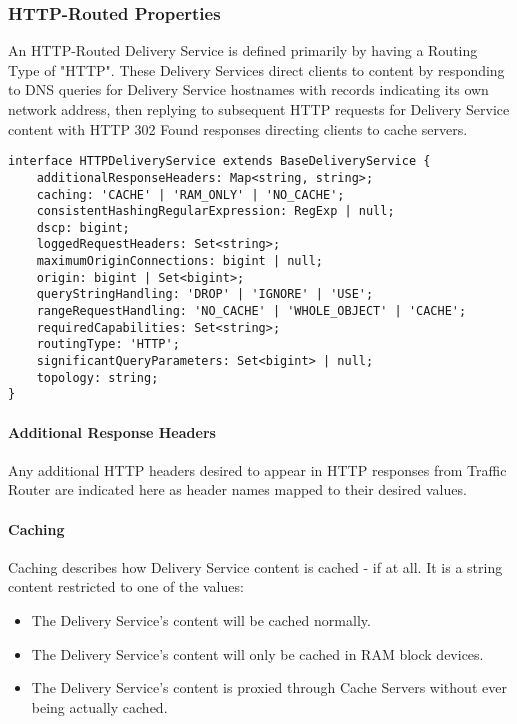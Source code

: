 \subsubsection{HTTP-Routed Properties}
An HTTP-Routed Delivery Service is defined primarily by having a Routing Type of
"HTTP". These Delivery Services direct clients to content by responding to DNS
queries for Delivery Service hostnames with records indicating its own network
address, then replying to subsequent HTTP requests for Delivery Service content
with HTTP 302 Found responses directing clients to cache servers.

\begin{codelisting}
\begin{verbatim}
interface HTTPDeliveryService extends BaseDeliveryService {
	additionalResponseHeaders: Map<string, string>;
	caching: 'CACHE' | 'RAM_ONLY' | 'NO_CACHE';
	consistentHashingRegularExpression: RegExp | null;
	dscp: bigint;
	loggedRequestHeaders: Set<string>;
	maximumOriginConnections: bigint | null;
	origin: bigint | Set<bigint>;
	queryStringHandling: 'DROP' | 'IGNORE' | 'USE';
	rangeRequestHandling: 'NO_CACHE' | 'WHOLE_OBJECT' | 'CACHE';
	requiredCapabilities: Set<string>;
	routingType: 'HTTP';
	significantQueryParameters: Set<bigint> | null;
	topology: string;
}
\end{verbatim}
\end{codelisting}

\paragraph{Additional Response Headers}
Any additional HTTP headers desired to appear in HTTP responses from Traffic
Router are indicated here as header names mapped to their desired values.

\paragraph{Caching}
Caching describes how Delivery Service content is cached - if at all. It is a
string content restricted to one of the values:

\begin{itemize}
	\item {} The Delivery Service's content will be cached normally.
	\item {} The Delivery Service's content will only be cached
	in RAM block devices.
	\item {} The Delivery Service's content is proxied through
	Cache Servers without ever being actually cached.
\end{itemize}


